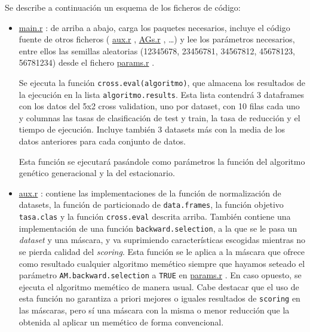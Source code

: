 \documentclass[a4paper,11pt]{article}
\newcommand{\hrefr}[1]{
\href{../bin/#1}{#1}
}
\begin{document}
Se describe a continuación un esquema de los ficheros de código:
\begin{itemize}
 \item \hrefr{main.r}: de arriba a abajo, carga los paquetes necesarios, incluye el código fuente de otros ficheros
  (\hrefr{aux.r}, \hrefr{AGs.r}, \ldots) y lee los parámetros necesarios, entre ellos las 
  semillas aleatorias (12345678, 23456781, 34567812, 45678123, 56781234) desde el fichero \hrefr{params.r}.
  
  Se ejecuta la función \texttt{cross.eval(algoritmo)}, que almacena los resultados de la ejecución en la lista
  \texttt{algoritmo.results}. Esta lista contendrá 3 dataframes con los datos del 5x2 cross validation, uno por dataset, 
  con 10 filas cada uno  y columnas las tasas de clasificación de test y train, la tasa de reducción y el tiempo de 
  ejecución. Incluye también 3 datasets más con la media de los datos anteriores para cada conjunto de datos.
 
  Esta función se ejecutará pasándole como parámetros la función del algoritmo genético generacional y la del estacionario.
  
 \item \hrefr{aux.r}: contiene las implementaciones de la función de normalización de datasets, la función de
 particionado de \texttt{data.frames}, la función objetivo \texttt{tasa.clas} y la función \texttt{cross.eval}
 descrita arriba. También contiene una implementación de una función \texttt{backward.selection}, a la que se le pasa
 un \textit{dataset} y una máscara, y va suprimiendo características escogidas mientras no se pierda calidad del \textit{scoring}.
 Esta función se le aplica a la máscara que ofrece como resultado cualquier algoritmo memético siempre que hayamos
 seteado el parámetro \texttt{AM.backward.selection} a \texttt{TRUE} en \hrefr{params.r}. En caso opuesto, se ejecuta
 el algoritmo memético de manera usual. Cabe destacar que el uso de esta función no garantiza a priori mejores o iguales
 resultados de \texttt{scoring} en las máscaras, pero sí una máscara con la misma o menor reducción que la obtenida al aplicar
 un memético de forma convencional.
 

\end{itemize}
\end{document}

